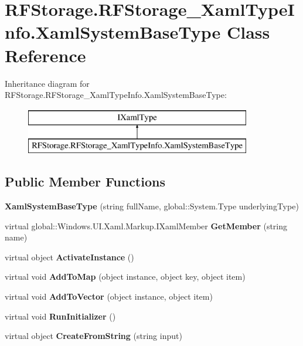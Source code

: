 \section{R\+F\+Storage.\+R\+F\+Storage\+\_\+\+Xaml\+Type\+Info.\+Xaml\+System\+Base\+Type Class Reference}
\label{class_r_f_storage_1_1_r_f_storage___xaml_type_info_1_1_xaml_system_base_type}
Inheritance diagram for R\+F\+Storage.\+R\+F\+Storage\+\_\+\+Xaml\+Type\+Info.\+Xaml\+System\+Base\+Type\+:\begin{figure}[H]
\begin{center}
\leavevmode
\includegraphics[height=2.000000cm]{class_r_f_storage_1_1_r_f_storage___xaml_type_info_1_1_xaml_system_base_type}
\end{center}
\end{figure}
\subsection*{Public Member Functions}
\begin{DoxyCompactItemize}
\item 
\mbox{\label{class_r_f_storage_1_1_r_f_storage___xaml_type_info_1_1_xaml_system_base_type_a86e911df27f8f1650397d36f910457ab}} 
{\bfseries Xaml\+System\+Base\+Type} (string full\+Name, global\+::\+System.\+Type underlying\+Type)
\item 
\mbox{\label{class_r_f_storage_1_1_r_f_storage___xaml_type_info_1_1_xaml_system_base_type_ae0827e1da67a1d60712bcbb991b64bfb}} 
virtual global\+::\+Windows.\+U\+I.\+Xaml.\+Markup.\+I\+Xaml\+Member {\bfseries Get\+Member} (string name)
\item 
\mbox{\label{class_r_f_storage_1_1_r_f_storage___xaml_type_info_1_1_xaml_system_base_type_a2f475ae2b2e0437b2cca018d6b6a50f9}} 
virtual object {\bfseries Activate\+Instance} ()
\item 
\mbox{\label{class_r_f_storage_1_1_r_f_storage___xaml_type_info_1_1_xaml_system_base_type_afc23b9f1eac9a5be88bbcf303cc58ffb}} 
virtual void {\bfseries Add\+To\+Map} (object instance, object key, object item)
\item 
\mbox{\label{class_r_f_storage_1_1_r_f_storage___xaml_type_info_1_1_xaml_system_base_type_a66478ccd1c021bc3bdbfe26020c76575}} 
virtual void {\bfseries Add\+To\+Vector} (object instance, object item)
\item 
\mbox{\label{class_r_f_storage_1_1_r_f_storage___xaml_type_info_1_1_xaml_system_base_type_a8b0d3832cd6e592f799446492bafc012}} 
virtual void {\bfseries Run\+Initializer} ()
\item 
\mbox{\label{class_r_f_storage_1_1_r_f_storage___xaml_type_info_1_1_xaml_system_base_type_ac8120674a1d39f33cde91dcc587026de}} 
virtual object {\bfseries Create\+From\+String} (string input)
\end{DoxyCompactItemize}
